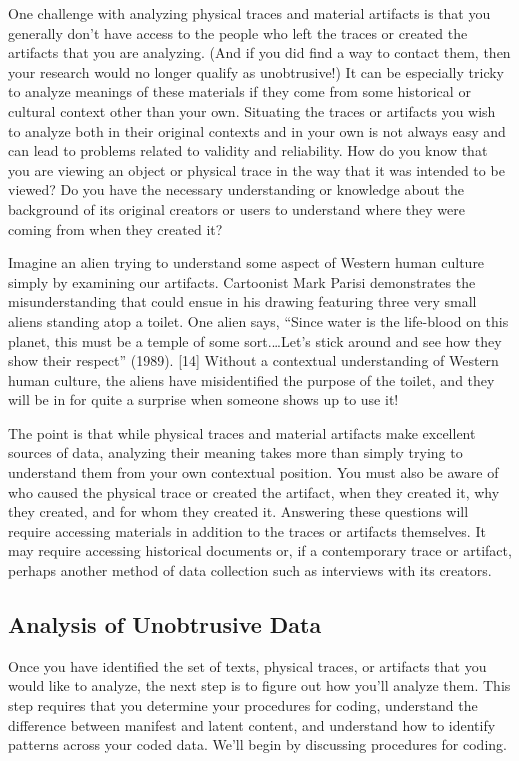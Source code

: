 One challenge with analyzing physical traces and material artifacts is that you generally don’t have access to the people who left the traces or created the artifacts that you are analyzing. (And if you did find a way to contact them, then your research would no longer qualify as unobtrusive!) It can be especially tricky to analyze meanings of these materials if they come from some historical or cultural context other than your own. Situating the traces or artifacts you wish to analyze both in their original contexts and in your own is not always easy and can lead to problems related to validity and reliability. How do you know that you are viewing an object or physical trace in the way that it was intended to be viewed? Do you have the necessary understanding or knowledge about the background of its original creators or users to understand where they were coming from when they created it?

Imagine an alien trying to understand some aspect of Western human culture simply by examining our artifacts. Cartoonist Mark Parisi demonstrates the misunderstanding that could ensue in his drawing featuring three very small aliens standing atop a toilet. One alien says, ``Since water is the life-blood on this planet, this must be a temple of some sort.…Let’s stick around and see how they show their respect'' (1989). [14] Without a contextual understanding of Western human culture, the aliens have misidentified the purpose of the toilet, and they will be in for quite a surprise when someone shows up to use it!

The point is that while physical traces and material artifacts make excellent sources of data, analyzing their meaning takes more than simply trying to understand them from your own contextual position. You must also be aware of who caused the physical trace or created the artifact, when they created it, why they created, and for whom they created it. Answering these questions will require accessing materials in addition to the traces or artifacts themselves. It may require accessing historical documents or, if a contemporary trace or artifact, perhaps another method of data collection such as interviews with its creators.

\subsection{Analysis of Unobtrusive Data}

Once you have identified the set of texts, physical traces, or artifacts that you would like to analyze, the next step is to figure out how you’ll analyze them. This step requires that you determine your procedures for coding, understand the difference between manifest and latent content, and understand how to identify patterns across your coded data. We’ll begin by discussing procedures for coding.

